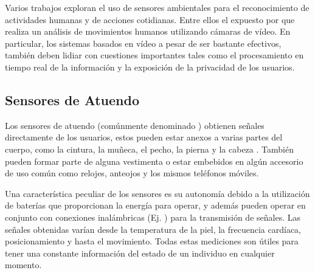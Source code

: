 Varios trabajos exploran el uso de sensores ambientales para el reconocimiento
de actividades humanas y de acciones cotidianas. Entre ellos el expuesto
por \cite{Poppe2007} que realiza un análisis de movimientos humanos
utilizando cámaras de vídeo. En particular, los sistemas basados en
vídeo a pesar de ser bastante efectivos, también deben lidiar con
cuestiones importantes tales como el procesamiento en tiempo real
de la información y la exposición de la privacidad de los usuarios.

\subsection{Sensores de Atuendo}

Los sensores de atuendo (comúnmente denominado\emph{ })
obtienen señales directamente de los usuarios, estos pueden estar
anexos a varias partes del cuerpo, como la cintura, la muñeca, el
pecho, la pierna y la cabeza \cite{Bao2004}. También pueden formar
parte de alguna vestimenta o estar embebidos en algún accesorio de
uso común como relojes, anteojos y los mismos teléfonos móviles. 

Una característica peculiar de los sensores es su autonomía debido
a la utilización de baterías que proporcionan la energía para operar,
y además pueden operar en conjunto con conexiones inalámbricas (Ej.
) para la transmisión de señales. Las señales obtenidas
varían desde la temperatura de la piel, la frecuencia cardíaca, posicionamiento
y hasta el movimiento. Todas estas mediciones son útiles para tener
una constante información del estado de un individuo en cualquier
momento.

